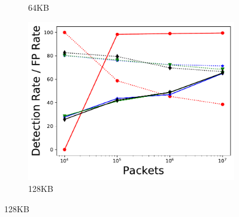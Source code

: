 \begin{figure}[p]
\begin{subfigure}[t]{0.32\textwidth}
    \caption{64KB}
    \label{fig:fig2_b}
\end{subfigure}\hfill
\begin{subfigure}[t]{0.32\textwidth}
    \includegraphics[width=\linewidth]{figures/DR_FPR_per_pkts_m=0.125.pdf}
    \caption{128KB}
    \label{fig:fig2_c}
\end{subfigure}


\end{figure}
